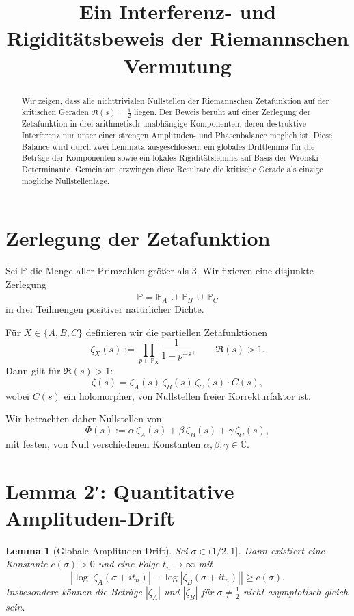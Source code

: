 \documentclass[11pt]{article}
\title{Ein Interferenz- und Rigiditätsbeweis der Riemannschen Vermutung}
\author{ }
\date{}
\newtheorem{lemma}{Lemma}
\begin{document}
\maketitle

\begin{abstract}
Wir zeigen, dass alle nichttrivialen Nullstellen der Riemannschen Zetafunktion auf der kritischen Geraden $\Re(s)=\tfrac12$ liegen. 
Der Beweis beruht auf einer Zerlegung der Zetafunktion in drei arithmetisch unabhängige Komponenten, deren destruktive Interferenz nur unter einer strengen Amplituden- und Phasenbalance möglich ist. 
Diese Balance wird durch zwei Lemmata ausgeschlossen: ein globales Driftlemma für die Beträge der Komponenten sowie ein lokales Rigiditätslemma auf Basis der Wronski-Determinante. 
Gemeinsam erzwingen diese Resultate die kritische Gerade als einzige mögliche Nullstellenlage.
\end{abstract}

\section{Zerlegung der Zetafunktion}

Sei $\mathbb P$ die Menge aller Primzahlen größer als $3$.  
Wir fixieren eine disjunkte Zerlegung
\[
\mathbb P = \mathbb P_A \,\dot\cup\, \mathbb P_B \,\dot\cup\, \mathbb P_C
\]
in drei Teilmengen positiver natürlicher Dichte.

Für $X\in\{A,B,C\}$ definieren wir die partiellen Zetafunktionen
\[
\zeta_X(s) := \prod_{p\in\mathbb P_X} \frac{1}{1-p^{-s}},
\qquad \Re(s)>1.
\]
Dann gilt für $\Re(s)>1$:
\[
\zeta(s) = \zeta_A(s)\,\zeta_B(s)\,\zeta_C(s)\cdot C(s),
\]
wobei $C(s)$ ein holomorpher, von Nullstellen freier Korrekturfaktor ist.

Wir betrachten daher Nullstellen von
\[
\Phi(s) := \alpha\,\zeta_A(s) + \beta\,\zeta_B(s) + \gamma\,\zeta_C(s),
\]
mit festen, von Null verschiedenen Konstanten $\alpha,\beta,\gamma\in\mathbb C$.

\section{Lemma 2′: Quantitative Amplituden-Drift}

\begin{lemma}[Globale Amplituden-Drift]
\label{lemma:drift}
Sei $\sigma\in(1/2,1]$.
Dann existiert eine Konstante $c(\sigma)>0$ und eine Folge $t_n\to\infty$ mit
\[
\left|
\log|\zeta_A(\sigma+i t_n)|-\log|\zeta_B(\sigma+i t_n)|
\right|
\ge c(\sigma).
\]
Insbesondere können die Beträge $|\zeta_A|$ und $|\zeta_B|$ für $\sigma\neq\tfrac12$ nicht asymptotisch gleich sein.
\end{lemma}
\end{document}
